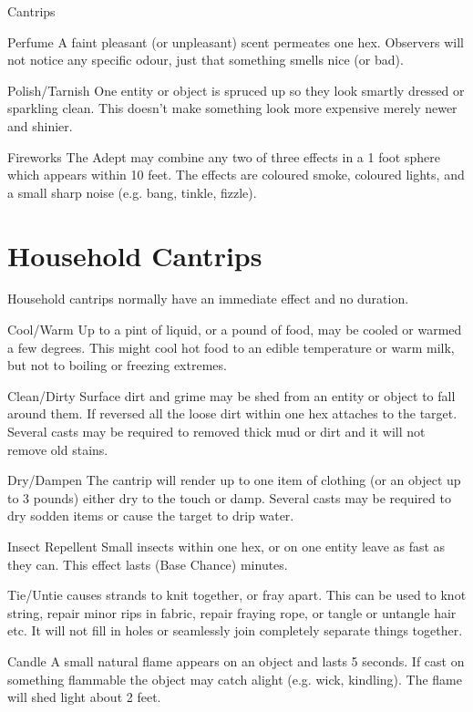 \begin{Chapter}{Cantrips}
\begin{Description}
\item[Perfume] A faint pleasant (or unpleasant) scent permeates one
  hex.  Observers will not notice any specific odour, just that
  something smells nice (or bad).

\item[Polish/Tarnish] One entity or object is spruced up so they look
  smartly dressed or sparkling clean.  This doesn’t make something
  look more expensive merely newer and shinier.

\item[Fireworks] The Adept may combine any two of three effects in a 1
  foot sphere which appears within 10 feet.  The effects are coloured
  smoke, coloured lights, and a small sharp noise (e.g. bang, tinkle,
  fizzle).

\end{Description}


\section{Household Cantrips}

Household cantrips normally have an immediate effect and no duration.

\begin{Description}

\item[Cool/Warm Up] to a pint of liquid, or a pound of food, may be
  cooled or warmed a few degrees.  This might cool hot food to an
  edible temperature or warm milk, but not to boiling or freezing
  extremes.

\item[Clean/Dirty Surface] dirt and grime may be shed from an entity
  or object to fall around them.  If reversed all the loose dirt
  within one hex attaches to the target.  Several casts may be
  required to removed thick mud or dirt and it will not remove old
  stains.

\item[Dry/Dampen] The cantrip will render up to one item of clothing
  (or an object up to 3 pounds) either dry to the touch or damp.
  Several casts may be required to dry sodden items or cause the
  target to drip water.

\item[Insect Repellent] Small insects within one hex, or on one entity
  leave as fast as they can. This effect lasts (Base Chance) minutes.

\item[Tie/Untie] causes strands to knit together, or fray apart. This
  can be used to knot string, repair minor rips in fabric, repair
  fraying rope, or tangle or untangle hair etc.  It will not fill in
  holes or seamlessly join completely separate things together.

\item[Candle] A small natural flame appears on an object and lasts 5
  seconds.  If cast on something flammable the object may catch alight
  (e.g. wick, kindling). The flame will shed light about 2 feet.

\end{Description}

\end{Chapter}
